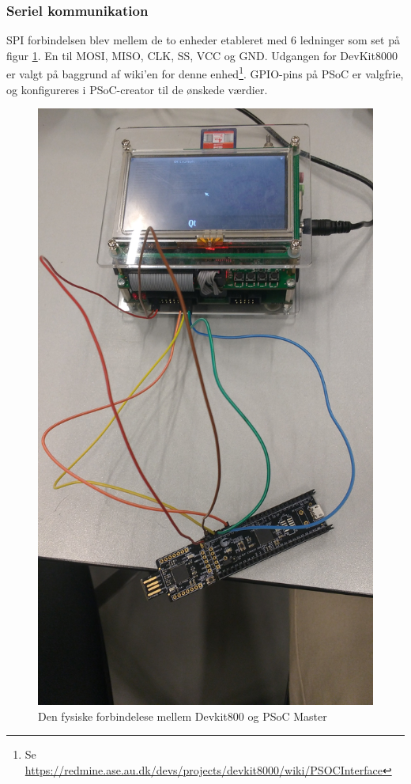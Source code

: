 \subsubsection{Seriel kommunikation}

SPI forbindelsen blev mellem de to enheder etableret med 6 ledninger som set på figur \ref{ffm_DK8k_PSoC}. En til MOSI, MISO, CLK, SS, VCC og GND.
Udgangen for DevKit8000 er valgt på baggrund af wiki'en for denne enhed\footnote{Se \url{https://redmine.ase.au.dk/devs/projects/devkit8000/wiki/PSOCInterface}}. GPIO-pins på PSoC er valgfrie, og konfigureres 
i PSoC-creator til de ønskede værdier.

\begin{figure}[H]
	\centerline{\includegraphics[scale=0.07]{tex/TeImRe/SPI/Realisering_devkit_psoc}}
	\caption{Den fysiske forbindelese mellem Devkit800 og PSoC Master}
	\label{ffm_DK8k_PSoC}
\end{figure}

